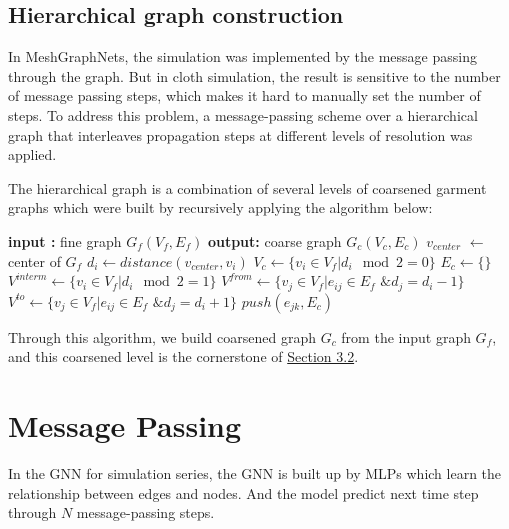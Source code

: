 \documentclass{article}
\begin{document}
\subsection{Hierarchical graph construction}
\par In MeshGraphNets\cite{pfaff2021learning}, the simulation was implemented by the message passing through the graph. But in cloth simulation, the result is sensitive to the number of message passing steps, which makes it hard to manually set the number of steps. To address this problem, a message-passing scheme over a hierarchical graph that interleaves propagation steps at different levels of resolution was applied.
\par The hierarchical graph is a combination of several levels of coarsened garment graphs which were built by recursively applying the algorithm below:
\newpage
\begin{algorithmic}[1]
    \State \textbf{input :} fine graph $G_f(V_f,E_f)$
    \State \textbf{output:} coarse graph $G_c(V_c,E_c)$
    \State $v_{center}$ $\gets$ center of $G_f$
        \State $d_i \gets distance(v_{center}, v_i)$
    \EndFor
    \State $V_c \gets \{v_i \in V_f | d_i \mod 2 = 0\}$
    \State $E_c \gets \{\}$
    \State $V^{interm} \gets \{v_i \in V_f | d_i \mod 2 = 1\}$
        \State $V^{from} \gets \{v_j \in V_f | e_{ij} \in E_f \text{ \& } d_j = d_i - 1\}$
        \State $V^{to} \gets \{v_j \in V_f | e_{ij} \in E_f \text{ \& } d_j = d_i + 1\}$
                \State $push(e_{jk}, E_c)$
            \EndFor
        \EndFor
    \EndFor
\end{algorithmic}
\par Through this algorithm, we build coarsened graph $G_c$ from the input graph $G_f$, and this coarsened level is the cornerstone of \href{sec:MLMP}{Section 3.2}.
\section{Message Passing}
\par In the GNN for simulation series, the GNN is built up by MLPs which learn the relationship between edges and nodes. And the model predict next time step through $N$ message-passing steps.
\end{document}

